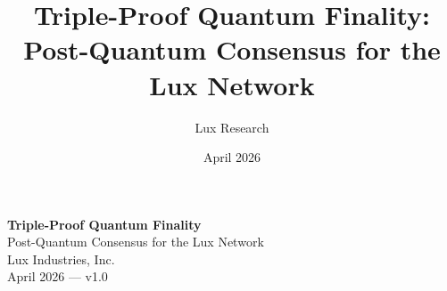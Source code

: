 \documentclass[11pt,a4paper]{article}
\title{Triple-Proof Quantum Finality: Post-Quantum Consensus for the Lux Network}
\author{Lux Research}
\date{April 2026}
\begin{document}
\luxcoverpage

\begin{center}
{\LARGE\bfseries Triple-Proof Quantum Finality}\\[0.5em]
{\Large Post-Quantum Consensus for the Lux Network}\\[1em]
{\large Lux Industries, Inc.}\\[0.5em]
{\normalsize April 2026 --- v1.0}
\end{center}

\vspace{1em}











\end{document}
